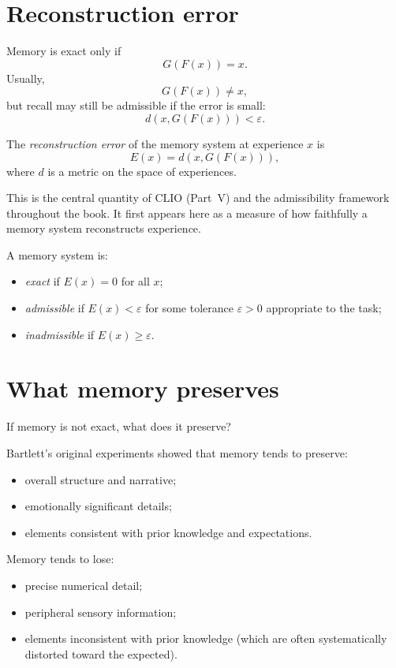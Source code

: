 \section{Reconstruction error}

Memory is exact only if
\[
  G(F(x)) = x.
\]
Usually,
\[
  G(F(x)) \neq x,
\]
but recall may still be admissible if the error is small:
\[
  d(x, G(F(x))) < \varepsilon.
\]

\begin{definition}
  The \emph{reconstruction error} of the memory system at
  experience $x$ is
  \[
    E(x) = d(x, G(F(x))),
  \]
  where $d$ is a metric on the space of experiences.
\end{definition}

This is the central quantity of CLIO (Part~V) and the
admissibility framework throughout the book.
It first appears here as a measure of how faithfully a memory
system reconstructs experience.

A memory system is:
\begin{itemize}[leftmargin=2em]
  \item \emph{exact} if $E(x) = 0$ for all $x$;
  \item \emph{admissible} if $E(x) < \varepsilon$ for some
    tolerance $\varepsilon > 0$ appropriate to the task;
  \item \emph{inadmissible} if $E(x) \geq \varepsilon$.
\end{itemize}

\section{What memory preserves}

If memory is not exact, what does it preserve?

Bartlett's original experiments showed that memory tends to
preserve:
\begin{itemize}[leftmargin=2em]
  \item overall structure and narrative;
  \item emotionally significant details;
  \item elements consistent with prior knowledge and expectations.
\end{itemize}

Memory tends to lose:
\begin{itemize}[leftmargin=2em]
  \item precise numerical detail;
  \item peripheral sensory information;
  \item elements inconsistent with prior knowledge (which are
    often systematically distorted toward the expected).
\end{itemize}

